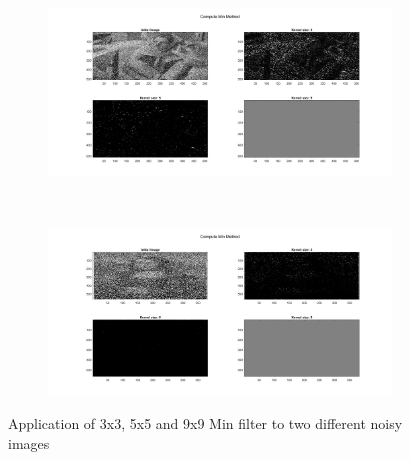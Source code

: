 \documentclass{article}
\begin{document}
	\begin{figure}[h!]
		\centering
		\begin{subfigure}[t]{0.5\textwidth}
			\centering
			\includegraphics[height=\linewidth, width=\linewidth]{./output_images/img_noisy_1_min.jpg}
		\end{subfigure}%
		~
		\begin{subfigure}[t]{0.5\textwidth}
			\centering
			\includegraphics[height=\linewidth, width=\linewidth]{./output_images/img_noisy_2_min.jpg}
		\end{subfigure}	
		\caption{Application of 3x3, 5x5 and 9x9 Min filter to two different noisy images}
	\end{figure}
	
\end{document}
